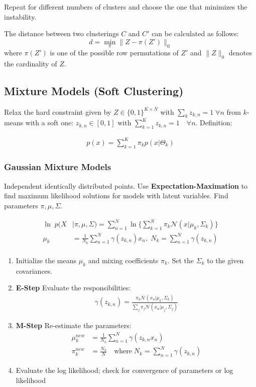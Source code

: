 \documentclass[a4paper,landscape,10pt]{article}
\newlength{\wideitemsep}
\let\olditem\item
\renewcommand{\item}{\setlength{\itemsep}{\wideitemsep}\olditem}
\begin{document}
\begin{multicols}{4}
Repeat for different numbers of clusters and choose the one that
minimizes the instability.

The distance between two clusterings $C$ and $C'$ can be calculated as follows:
\begin{equation*}
    d = \min_\pi \| Z - \pi(Z') \|_0
\end{equation*}
where $\pi(Z')$ is one of the possible row permutations of $Z'$ and $\|Z\|_0$
denotes the cardinality of $Z$.

\subsection{Mixture Models (Soft Clustering)}
Relax the hard constraint given by $Z \in \{0,1\}^{K \times N}$ with $\sum_k
z_{k,n} = 1 \; \forall n$ from $k$-means with a soft one:
$z_{k,n} \in [0,1] \text{ with } \sum_{k=1}^{K} z_{k,n} = 1 \quad \forall n$.
Definition:

\begin{align*}
    p(x) = \sum_{k=1}^K \pi_k p(x | \Theta_k)
\end{align*}

\subsubsection{Gaussian Mixture Models}

Independent identically distributed points. Use {\bf Expectation-Maximation} to
find maximum likelihood solutions for models with latent variables. Find
parameters $\pi, \mu, \Sigma$.

\begin{align*}
    \ln\;p(X &| \pi, \mu, \Sigma) = \sum_{n=1}^{N} \ln \bigg\{ \sum_{k=1}^N
    \pi_k \mathcal{N}(x | \mu_k, \Sigma_k)  \bigg\} \\
    \mu_k &= \frac{1}{N_k} \sum_{n=1}^N \gamma(z_{k,n}) x_n, \; N_k =
    \sum_{n=1}^N \gamma(z_{k,n}) \\
\end{align*}

\begin{enumerate}
    \item Initialize the means $\mu_k$ and mixing coefficients $\pi_k$. Set the
    $\Sigma_k$ to the given covariances.
    \item {\bf E-Step} Evaluate the responsibilities:
    \begin{align*}
        \gamma(z_{k,n}) = \frac{\pi_k \mathcal{N}(x_n | \mu_k,
    \Sigma_k)}{\sum_{j} \pi_j \mathcal{N}(x_n | \mu_j, \Sigma_j)}
    \end{align*}
    \item {\bf M-Step} Re-estimate the parameters:
    \begin{align*}
        \mu_k^{new} &= \frac{1}{N_k}\sum_{n=1}^N \gamma(z_{k,n}x_n) \\
        \pi_k^{new} &= \frac{N_k}{N} \quad \text{where} \; N_k = \sum_{n=1}^N
        \gamma(z_{k,n})
    \end{align*}
    \item Evaluate the log likelihood; check for convergence of
    parameters or log likelihood
\end{enumerate}


\end{multicols}
\end{document}

